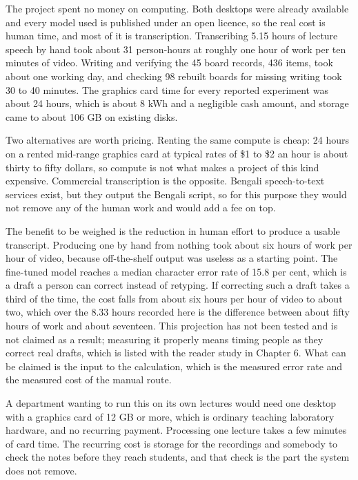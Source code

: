 The project spent no money on computing. Both desktops were already available and every
model used is published under an open licence, so the real cost is human time, and most
of it is transcription. Transcribing 5.15 hours of lecture speech by hand took about 31
person-hours at roughly one hour of work per ten minutes of video. Writing and verifying
the 45 board records, 436 items, took about one working day, and checking 98 rebuilt
boards for missing writing took 30 to 40 minutes. The graphics card time for every
reported experiment was about 24 hours, which is about 8 kWh and a negligible cash
amount, and storage came to about 106 GB on existing disks.

Two alternatives are worth pricing. Renting the same compute is cheap: 24 hours on a
rented mid-range graphics card at typical rates of \$1 to \$2 an
hour is about thirty to fifty dollars, so compute is not what makes a project of this
kind expensive. Commercial transcription is the opposite. Bengali speech-to-text services
exist, but they output the Bengali script, so for this purpose they would not remove any
of the human work and would add a fee on top.

The benefit to be weighed is the reduction in human effort to produce a usable
transcript. Producing one by hand from nothing took about six hours of work per hour of
video, because off-the-shelf output was useless as a starting point. The fine-tuned model
reaches a median character error rate of 15.8 per cent, which is a draft a person can
correct instead of retyping. If correcting such a draft takes a third of the time, the
cost falls from about six hours per hour of video to about two, which over the 8.33 hours
recorded here is the difference between about fifty hours of work and about seventeen.
This projection has not been tested and is not claimed as a result; measuring it properly
means timing people as they correct real drafts, which is listed with the reader study in
Chapter 6. What can be claimed is the input to the calculation, which is the measured
error rate and the measured cost of the manual route.

A department wanting to run this on its own lectures would need one desktop with a
graphics card of 12 GB or more, which is ordinary teaching laboratory hardware, and no
recurring payment. Processing one lecture takes a few minutes of card time. The recurring
cost is storage for the recordings and somebody to check the notes before they reach
students, and that check is the part the system does not remove.
